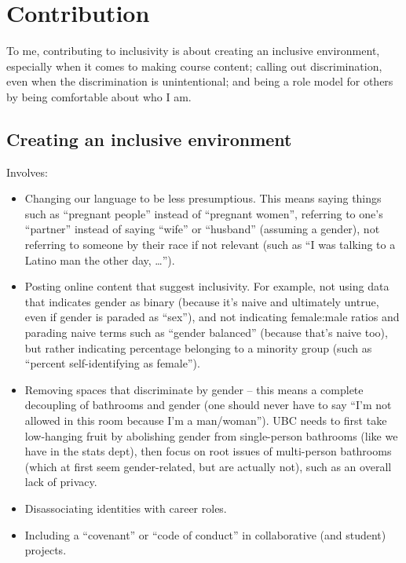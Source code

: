 \documentclass[]{book}
\providecommand{\tightlist}{%
  \setlength{\itemsep}{0pt}\setlength{\parskip}{0pt}}
\begin{document}
\hypertarget{contribution}{%
\section{Contribution}\label{contribution}}

To me, contributing to inclusivity is about creating an inclusive environment, especially when it comes to making course content; calling out discrimination, even when the discrimination is unintentional; and being a role model for others by being comfortable about who I am.

\hypertarget{creating-an-inclusive-environment}{%
\subsection{Creating an inclusive environment}\label{creating-an-inclusive-environment}}

Involves:

\begin{itemize}
\tightlist
\item
  Changing our language to be less presumptious. This means saying things such as ``pregnant people'' instead of ``pregnant women'', referring to one's ``partner'' instead of saying ``wife'' or ``husband'' (assuming a gender), not referring to someone by their race if not relevant (such as ``I was talking to a Latino man the other day, \ldots{}'').
\item
  Posting online content that suggest inclusivity. For example, not using data that indicates gender as binary (because it's naive and ultimately untrue, even if gender is paraded as ``sex''), and not indicating female:male ratios and parading naive terms such as ``gender balanced'' (because that's naive too), but rather indicating percentage belonging to a minority group (such as ``percent self-identifying as female'').
\item
  Removing spaces that discriminate by gender -- this means a complete decoupling of bathrooms and gender (one should never have to say ``I'm not allowed in this room because I'm a man/woman''). UBC needs to first take low-hanging fruit by abolishing gender from single-person bathrooms (like we have in the stats dept), then focus on root issues of multi-person bathrooms (which at first seem gender-related, but are actually not), such as an overall lack of privacy.
\item
  Disassociating identities with career roles.
\item
  Including a ``covenant'' or ``code of conduct'' in collaborative (and student) projects.
\end{itemize}
\end{document}
